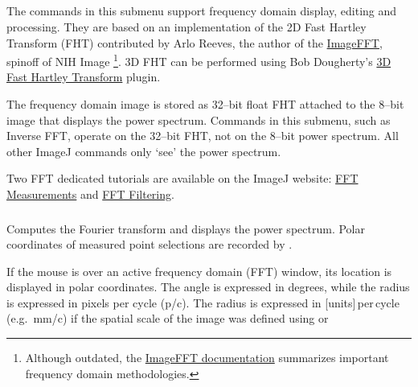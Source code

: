 

\subsection{\protect{}\label{sub:FFT}}

The commands in this submenu support frequency domain display, editing
and processing. They are based on an implementation of the 2D Fast
Hartley Transform (FHT)
contributed by Arlo Reeves, the author of the \href{http://imagej.nih.gov/ij/download/docs/ImageFFT/}{ImageFFT},
spinoff of NIH Image%
\footnote{Although outdated, the \href{http://imagej.nih.gov/ij/download/docs/ImageFFT/FFT-docs.pdf}{ImageFFT documentation}
summarizes important frequency domain methodologies.%
}. 3D FHT can be performed using Bob Dougherty's \href{http://www.optinav.com/FHT3D.htm}{3D Fast Hartley Transform}
plugin. 

The frequency domain image is stored as 32--bit
float FHT attached to the 8--bit image that displays the power spectrum.
Commands in this submenu, such as Inverse FFT, operate on the 32--bit
FHT, not on the 8--bit power spectrum. All other ImageJ commands only
`see' the power spectrum. 

Two FFT dedicated tutorials are available on the ImageJ website: \href{http://imagej.nih.gov/ij/docs/examples/tem/}{FFT Measurements}
and \href{http://imagej.nih.gov/ij/docs/examples/FFT/}{FFT Filtering}.


\subsubsection{\protect{}}

Computes the Fourier transform
and displays the power spectrum. Polar coordinates
of measured point selections are recorded by .

If the mouse is over an active frequency domain (FFT) window, its
location is displayed in polar coordinates. The angle is expressed
in degrees, while the radius is expressed in pixels per cycle (p/c).
The radius is expressed in {[}units{]}\,per\,cycle (e.g.\ mm/c)
if the spatial scale of the image was defined using 
or 


